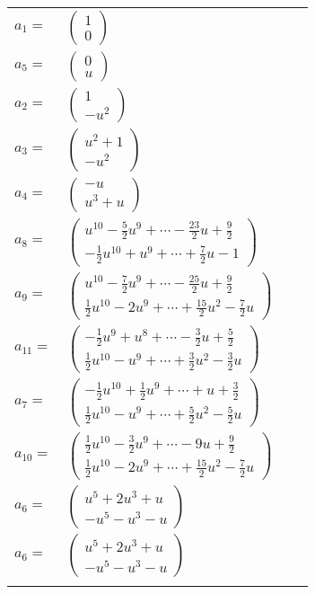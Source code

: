 \documentclass[1p]{elsarticle_modified}
\theoremstyle{definition}
\begin{document}
\begin{tabular}{m{7pt} m{180pt} m{7pt} m{180pt} }
\flushright $a_{1}=$&$\begin{pmatrix}1\\0\end{pmatrix}$ \\
\flushright $a_{5}=$&$\begin{pmatrix}0\\u\end{pmatrix}$ \\
\flushright $a_{2}=$&$\begin{pmatrix}1\\- u^2\end{pmatrix}$ \\
\flushright $a_{3}=$&$\begin{pmatrix}u^2+1\\- u^2\end{pmatrix}$ \\
\flushright $a_{4}=$&$\begin{pmatrix}- u\\u^3+u\end{pmatrix}$ \\
\flushright $a_{8}=$&$\begin{pmatrix}u^{10}-\frac{5}{2} u^9+\cdots-\frac{23}{2} u+\frac{9}{2}\\-\frac{1}{2} u^{10}+u^9+\cdots+\frac{7}{2} u-1\end{pmatrix}$ \\
\flushright $a_{9}=$&$\begin{pmatrix}u^{10}-\frac{7}{2} u^9+\cdots-\frac{25}{2} u+\frac{9}{2}\\\frac{1}{2} u^{10}-2 u^9+\cdots+\frac{15}{2} u^2-\frac{7}{2} u\end{pmatrix}$ \\
\flushright $a_{11}=$&$\begin{pmatrix}-\frac{1}{2} u^9+u^8+\cdots-\frac{3}{2} u+\frac{5}{2}\\\frac{1}{2} u^{10}- u^9+\cdots+\frac{3}{2} u^2-\frac{3}{2} u\end{pmatrix}$ \\
\flushright $a_{7}=$&$\begin{pmatrix}-\frac{1}{2} u^{10}+\frac{1}{2} u^9+\cdots+u+\frac{3}{2}\\\frac{1}{2} u^{10}- u^9+\cdots+\frac{5}{2} u^2-\frac{5}{2} u\end{pmatrix}$ \\
\flushright $a_{10}=$&$\begin{pmatrix}\frac{1}{2} u^{10}-\frac{3}{2} u^9+\cdots-9 u+\frac{9}{2}\\\frac{1}{2} u^{10}-2 u^9+\cdots+\frac{15}{2} u^2-\frac{7}{2} u\end{pmatrix}$ \\
\flushright $a_{6}=$&$\begin{pmatrix}u^5+2 u^3+u\\- u^5- u^3- u\end{pmatrix}$\\ \flushright $a_{6}=$&$\begin{pmatrix}u^5+2 u^3+u\\- u^5- u^3- u\end{pmatrix}$\\&\end{tabular}
\end{document}
